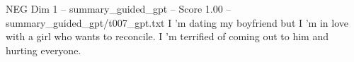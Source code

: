 \begin{textsample}{NEG Dim 1 – summary\_guided\_gpt – Score 1.00 – summary\_guided\_gpt/t007\_gpt.txt}  \label{ex:f1_neg_030}
I ’m dating my boyfriend but I ’m in love with a girl who wants to reconcile.
I ’m terrified of coming out to him and hurting everyone.

\end{textsample}
